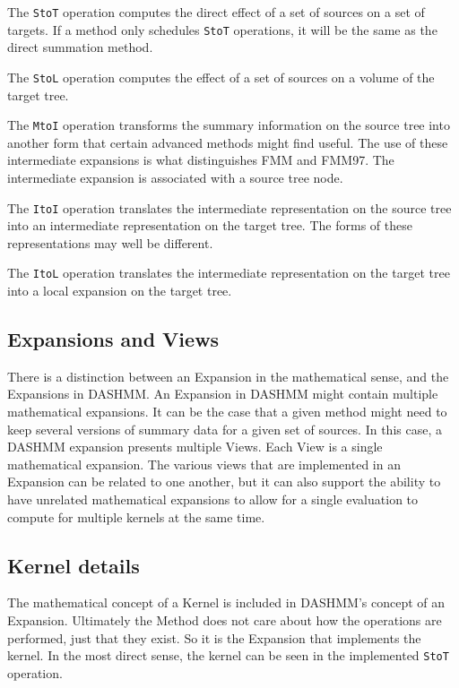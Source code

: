 The \texttt{StoT} operation computes the direct effect of a set of sources on
a set of targets. If a method only schedules \texttt{StoT} operations, it will
be the same as the direct summation method.

The \texttt{StoL} operation computes the effect of a set of sources on a
volume of the target tree.

The \texttt{MtoI} operation transforms the summary information on the source
tree into another form that certain advanced methods might find useful. The use
of these intermediate expansions is what distinguishes FMM and FMM97. The
intermediate expansion is associated with a source tree node.

The \texttt{ItoI} operation translates the intermediate representation on the
source tree into an intermediate representation on the target tree. The forms
of these representations may well be different.

The \texttt{ItoL} operation translates the intermediate representation on the
target tree into a local expansion on the target tree.

\subsection{Expansions and Views}

There is a distinction between an Expansion in the mathematical sense, and the
Expansions in DASHMM. An Expansion in DASHMM might contain multiple mathematical
expansions. It can be the case that a given method might need to keep
several versions of summary data for a given set of sources. In this case,
a DASHMM expansion presents multiple Views. Each View is a single mathematical
expansion. The various views that are implemented in an Expansion can be
related to one another, but it can also support the ability to have unrelated
mathematical expansions to allow for a single evaluation to compute for
multiple kernels at the same time.

\subsection{Kernel details}

The mathematical concept of a Kernel is included in DASHMM's concept of an
Expansion. Ultimately the Method does not care about how the operations are
performed, just that they exist. So it is the Expansion that implements the
kernel. In the most direct sense, the kernel can be seen in the implemented
\texttt{StoT} operation.

